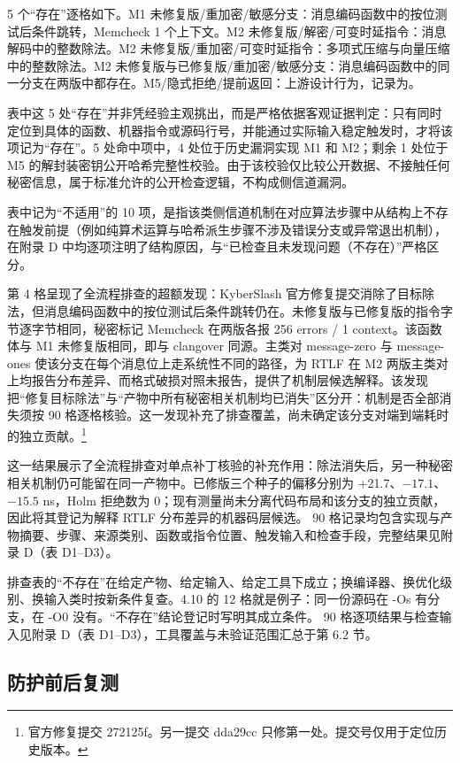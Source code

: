 5 个“存在”逐格如下。M1 未修复版/重加密/敏感分支：消息编码函数中的按位测试后条件跳转，Memcheck 1 个上下文。M2 未修复版/解密/可变时延指令：消息解码中的整数除法。M2 未修复版/重加密/可变时延指令：多项式压缩与向量压缩中的整数除法。M2 未修复版与已修复版/重加密/敏感分支：消息编码函数中的同一分支在两版中都存在。M5/隐式拒绝/提前返回：上游设计行为，记录为。%

表中这 5 处“存在”并非凭经验主观挑出，而是严格依据客观证据判定：只有同时定位到具体的函数、机器指令或源码行号，并能通过实际输入稳定触发时，才将该项记为“存在”。5 处命中项中，4 处位于历史漏洞实现 M1 和 M2；剩余 1 处位于 M5 的解封装密钥公开哈希完整性校验。由于该校验仅比较公开数据、不接触任何秘密信息，属于标准允许的公开检查逻辑，不构成侧信道漏洞。

表中记为“不适用”的 10 项，是指该类侧信道机制在对应算法步骤中从结构上不存在触发前提（例如纯算术运算与哈希派生步骤不涉及错误分支或异常退出机制），在附录 D 中均逐项注明了结构原因，与“已检查且未发现问题（不存在）”严格区分。%

第 4 格呈现了全流程排查的超额发现：KyberSlash 官方修复提交消除了目标除法，但消息编码函数中的按位测试后条件跳转仍在。未修复版与已修复版的指令字节逐字节相同，秘密标记 Memcheck 在两版各报 256 errors / 1 context。该函数体与 M1 未修复版相同，即与 clangover 同源。主类对 message-zero 与 message-ones 使该分支在每个消息位上走系统性不同的路径，为 RTLF 在 M2 两版主类对上均报告分布差异、而格式破损对照未报告，提供了机制层候选解释。该发现把“修复目标除法”与“产物中所有秘密相关机制均已消失”区分开：机制是否全部消失须按 90 格逐格核验。这一发现补充了排查覆盖，尚未确定该分支对端到端耗时的独立贡献。\footnote{官方修复提交 272125f。另一提交 dda29cc 只修第一处。提交号仅用于定位历史版本。} %

这一结果展示了全流程排查对单点补丁核验的补充作用：除法消失后，另一种秘密相关机制仍可能留在同一产物中。已修版三个种子的偏移分别为 +21.7、$-17.1$、$-15.5$ ns，Holm 拒绝数为 0；现有测量尚未分离代码布局和该分支的独立贡献，因此将其登记为解释 RTLF 分布差异的机器码层候选。%
90 格记录均包含实现与产物摘要、步骤、来源类别、函数或指令位置、触发输入和检查手段，完整结果见附录 D（表 D1--D3）。

排查表的“不存在”在给定产物、给定输入、给定工具下成立；换编译器、换优化级别、换输入类时按新条件复查。4.10 的 12 格就是例子：同一份源码在 -Os 有分支，在 -O0 没有。“不存在”结论登记时写明其成立条件。
90 格逐项结果与检查输入见附录 D（表 D1--D3），工具覆盖与未验证范围汇总于第 6.2 节。

\subsection{防护前后复测}

